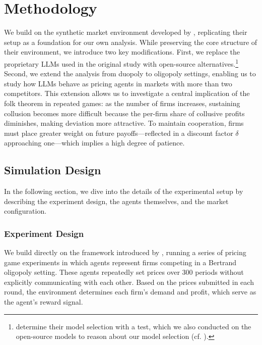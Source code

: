 \section{Methodology}\label{sec:meth}

We build on the synthetic market environment developed by \textcite{fish_algorithmic_2025}, replicating their setup as a foundation for our own analysis. While preserving the core structure of their environment, we introduce two key modifications. First, we replace the proprietary LLMs used in the original study with open-source alternatives.\footnote{\textcite{fish_algorithmic_2025} determine their model selection with a test, which we also conducted on the open-source models to reason about our model selection (cf. ).} Second, we extend the analysis from duopoly to oligopoly settings, enabling us to study how LLMs behave as pricing agents in markets with more than two competitors. This extension allows us to investigate a central implication of the folk theorem in repeated games: as the number of firms increases, sustaining collusion becomes more difficult because the per-firm share of collusive profits diminishes, making deviation more attractive. To maintain cooperation, firms must place greater weight on future payoffs—reflected in a discount factor $\delta$ approaching one—which implies a high degree of patience.

\subsection{Simulation Design}

In the following section, we dive into the details of the experimental setup by describing the experiment design, the agents themselves, and the market configuration.

\subsubsection*{Experiment Design}

We build directly on the framework introduced by \textcite{fish_algorithmic_2025}, running a series of pricing game experiments in which agents represent firms competing in a Bertrand oligopoly setting. These agents repeatedly set prices over 300 periods without explicitly communicating with each other. Based on the prices submitted in each round, the environment determines each firm's demand and profit, which serve as the agent’s reward signal.

